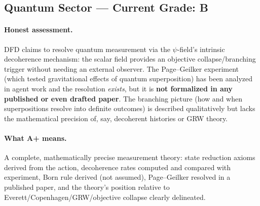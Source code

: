 \documentclass[11pt,a4paper]{article}
\begin{document}
\subsection{Quantum Sector --- Current Grade: B}

\paragraph{Honest assessment.}
DFD claims to resolve quantum measurement via the $\psi$-field's intrinsic decoherence mechanism: the scalar field provides an objective collapse/branching trigger without needing an external observer. The Page--Geilker experiment (which tested gravitational effects of quantum superposition) has been analyzed in agent work and the resolution \emph{exists}, but it is \textbf{not formalized in any published or even drafted paper}. The branching picture (how and when superpositions resolve into definite outcomes) is described qualitatively but lacks the mathematical precision of, say, decoherent histories or GRW theory.

\paragraph{What A+ means.}
A complete, mathematically precise measurement theory: state reduction axioms derived from the action, decoherence rates computed and compared with experiment, Born rule derived (not assumed), Page--Geilker resolved in a published paper, and the theory's position relative to Everett/Copenhagen/GRW/objective collapse clearly delineated.
\end{document}
